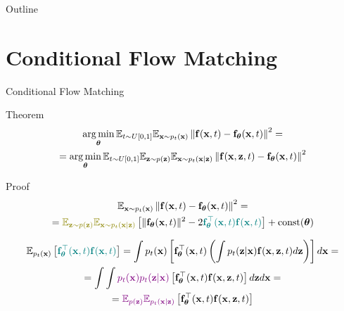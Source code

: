 \documentclass{beamer}
\renewcommand{\eqpause}{}
\renewcommand{\nextonslide}[1]{#1}
\begin{document}

\begin{frame}
\titlepage
	\resetonslide
\end{frame}






\begin{frame}{Outline}
	\tableofcontents
\end{frame}
\section{Conditional Flow Matching}
\begin{frame}{Conditional Flow Matching}
	\begin{block}{Theorem}
		\vspace{-0.7cm}
		\begin{multline*}
			\operatorname*{arg\,min}_{\boldsymbol{\theta}} \mathbb{E}_{t \sim U[0, 1]} \mathbb{E}_{\mathbf{x} \sim p_t(\mathbf{x})}\left\| \mathbf{f}(\mathbf{x}, t) - \mathbf{f}_{\boldsymbol{\theta}}(\mathbf{x}, t) \right\|^2 = \\
			= \operatorname*{arg\,min}_{\boldsymbol{\theta}} \mathbb{E}_{t \sim U[0, 1]} \mathbb{E}_{\mathbf{z} \sim p(\mathbf{z})} \mathbb{E}_{\mathbf{x} \sim p_t(\mathbf{x} | \mathbf{z})}\left\| \mathbf{f}(\mathbf{x}, \mathbf{z}, t) - \mathbf{f}_{\boldsymbol{\theta}}(\mathbf{x}, t) \right\|^2
		\end{multline*}
		\vspace{-0.7cm}
	\end{block}
    \eqpause
	\begin{block}{Proof}
		\vspace{-0.5cm}
		{\small
		\begin{multline*}
			\bbE_{\bx \sim p_t(\bx)}\left\| \bff(\bx, t) - \bff_{\btheta}(\bx, t) \right\|^2 = \\ 
			= {\color{olive}\bbE_{\bz \sim p(\bz)} \bbE_{\bx \sim p_t(\bx | \bz)}}\left[\| \bff_{\btheta}(\bx, t) \|^2 - 2 {\color{teal}\bff_{\btheta}^\top(\bx, t)\bff(\bx, t)} \right] + \text{const}(\btheta)
		\end{multline*}
		}
		\eqpause
		\vspace{-1.0cm}
		{\small
		\begin{multline*}
			\bbE_{p_t(\bx)} \left[{\color{teal}\bff_{\btheta}^\top(\bx, t)\bff(\bx, t)} \right] = \int p_t(\bx) \left[\bff_{\btheta}^\top(\bx, t) \left( \int p_t(\bz | \bx)\bff(\bx, \bz, t)d\bz \right) \right] d\bx 
			\nextonslide{ = \\ = \int \int {\color{violet}p_t(\bx) p_t(\bz | \bx)} \left[\bff_{\btheta}^\top(\bx, t) \bff(\bx, \bz, t) \right] d\bz d\bx}
			\nextonslide{ = \\ = {\color{violet}\bbE_{p(\bz)} \bbE_{p_t(\bx | \bz)}} \left[\bff_{\btheta}^\top(\bx, t) \bff(\bx, \bz, t) \right]}
		\end{multline*}
		}
	\end{block}
\end{frame}
\end{document}
